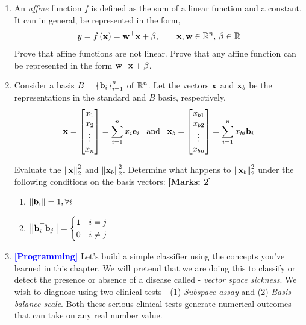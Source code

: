\begin{enumerate}
    \item An \textit{affine} function $f$ is defined as the sum of a linear function and a constant. It can in general, be represented in the form, 
    \[ y = f\left(\mathbf{x}\right) = \mathbf{w}^\top\mathbf{x} + \beta, \quad \quad \mathbf{x}, \mathbf{w} \in \mathbb{R}^n, \, \beta \in \mathbb{R} \]
    Prove that affine functions are not linear. Prove that any affine function can be represented in the form $\mathbf{w}^\top\mathbf{x} + \beta$.

    \item Consider a basis $B = \left\{\mathbf{b}_i\right\}_{i=1}^{n}$ of $\mathbb{R}^n$. Let the vectors $\mathbf{x}$ and $\mathbf{x}_b$ be the representations in the standard and $B$ basis, respectively. 
    \[ \mf{x} = \begin{bmatrix*}x_1\\x_2\\\vdots\\x_n\end{bmatrix*} = \sum_{i=1}^{n}x_i\mf{e}_i \,\,\,\,\, \text{and} \,\,\,\,\, \mf{x}_b =  \begin{bmatrix*}x_{b1}\\x_{b2}\\\vdots\\x_{bn}\end{bmatrix*} = \sum_{i=1}^{n}x_{bi}\mf{b}_i \]

    Evaluate the $\left\lVert \mathbf{x}\right\rVert_2^2$ and $\left\lVert \mathbf{x}_b\right\rVert_2^2$. Determine what happens to $\left\lVert \mathbf{x}_b\right\rVert_2^2$ under the following conditions on the basis vectors: \textbf{[Marks: 2]}
    \begin{enumerate}
        \item $\left\lVert \mathbf{b}_i\right\rVert = 1, \forall i$
        \item $\left\lVert \mathbf{b}_i^\top\mathbf{b}_j\right\rVert = \begin{cases}
        1 & i = j\\
        0 & i \neq j
        \end{cases}$
    \end{enumerate}

    \item \textcolor{blue}{\textbf{[Programming]}} Let's build a simple classifier using the concepts you've learned in this chapter. We will pretend that we are doing this to classify or detect the presence or absence of a disease called - \textit{vector space sickness}. We wish to diagnose using two clinical tests - (1) \textit{Subspace assay} and (2) \textit{Basis balance scale}. Both these serious clinical tests generate numerical outcomes that can take on any real number value.
    

\end{enumerate}
